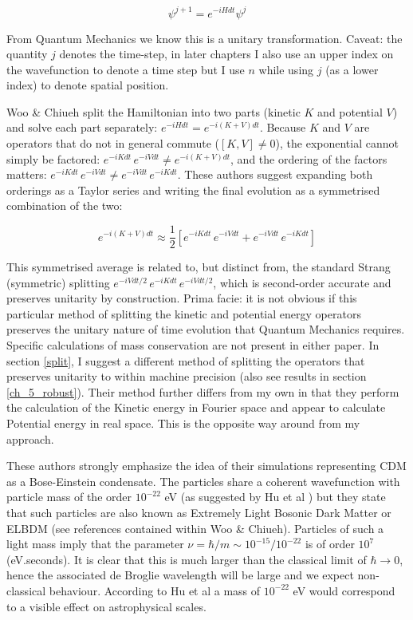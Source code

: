 \begin{equation}
\psi^{j+1} = e^{-i H dt} \psi^j
\end{equation}

\noindent From Quantum Mechanics we know this is a unitary transformation. Caveat: the quantity $j$ denotes the time-step, in later chapters I also use an upper index on the wavefunction to denote a time step but I use $n$ while using $j$ (as a lower index) to denote spatial position.

Woo \& Chiueh split the Hamiltonian into two parts (kinetic $K$ and potential $V$) and solve each part separately: $e^{-i H dt} = e^{-i(K + V)dt}$. Because $K$ and $V$ are operators that do not in general commute ($[K,V] \ne 0$), the exponential cannot simply be factored: $e^{-i K dt}\, e^{-i V dt} \ne e^{-i(K+V)dt}$, and the ordering of the factors matters: $e^{-i K dt}\, e^{-i V dt} \ne e^{-i V dt}\, e^{-i K dt}$. These authors suggest expanding both orderings as a Taylor series and writing the final evolution as a symmetrised combination of the two:

\begin{equation}
e^{-i(K + V)dt} \approx \frac{1}{2}[e^{-i K dt}\, e^{-i V dt} + e^{-i V dt}\, e^{-i K dt}]
\end{equation}

\noindent This symmetrised average is related to, but distinct from, the standard Strang (symmetric) splitting $e^{-iVdt/2}\, e^{-iKdt}\, e^{-iVdt/2}$, which is second-order accurate and preserves unitarity by construction. Prima facie: it is not obvious if this particular method of splitting the kinetic and potential energy operators preserves the unitary nature of time evolution that Quantum Mechanics requires. Specific calculations of mass conservation are not present in either paper. In section \ref{split}, I suggest a different method of splitting the operators that preserves unitarity to within machine precision (also see results in section \ref{ch_5_robust}). Their method further differs from my own in that they perform the calculation of the Kinetic energy in Fourier space and appear to calculate Potential energy in real space. This is the opposite way around from my approach.

These authors strongly emphasize the idea of their simulations representing CDM as a Bose-Einstein condensate. The particles share a coherent wavefunction with particle mass of the order $10^{-22}$ eV (as suggested by Hu et al \citep{bib_whu}) but they state that such particles are also known as Extremely Light Bosonic Dark Matter or ELBDM (see references contained within Woo \& Chiueh). Particles of such a light mass imply that the parameter $\nu = \hbar/m \sim 10^{-15}/10^{-22}$ is of order $10^{7}$ (eV.seconds). It is clear that this is much larger than the classical limit of $\hbar \rightarrow 0$, hence the associated de Broglie wavelength will be large and we expect non-classical behaviour. According to Hu et al a mass of $10^{-22}$ eV would correspond to a visible effect on astrophysical scales.

